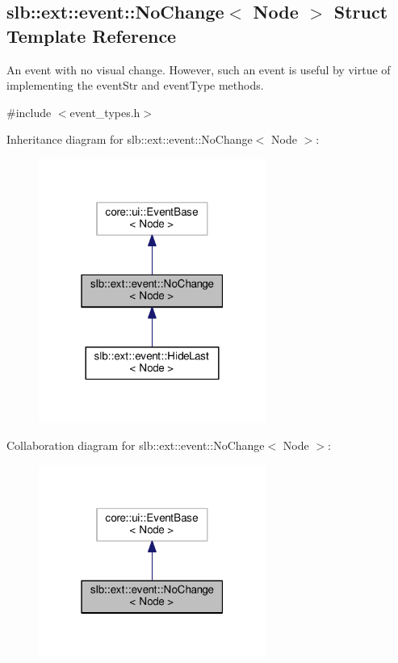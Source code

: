 \hypertarget{structslb_1_1ext_1_1event_1_1NoChange}{}\subsection{slb\+:\+:ext\+:\+:event\+:\+:No\+Change$<$ Node $>$ Struct Template Reference}
\label{structslb_1_1ext_1_1event_1_1NoChange}


An event with no visual change. However, such an event is useful by virtue of implementing the {\ttfamily event\+Str} and {\ttfamily event\+Type} methods.  




{\ttfamily \#include $<$event\+\_\+types.\+h$>$}



Inheritance diagram for slb\+:\+:ext\+:\+:event\+:\+:No\+Change$<$ Node $>$\+:\nopagebreak
\begin{figure}[H]
\begin{center}
\leavevmode
\includegraphics[width=211pt]{structslb_1_1ext_1_1event_1_1NoChange__inherit__graph}
\end{center}
\end{figure}


Collaboration diagram for slb\+:\+:ext\+:\+:event\+:\+:No\+Change$<$ Node $>$\+:\nopagebreak
\begin{figure}[H]
\begin{center}
\leavevmode
\includegraphics[width=211pt]{structslb_1_1ext_1_1event_1_1NoChange__coll__graph}
\end{center}
\end{figure}


